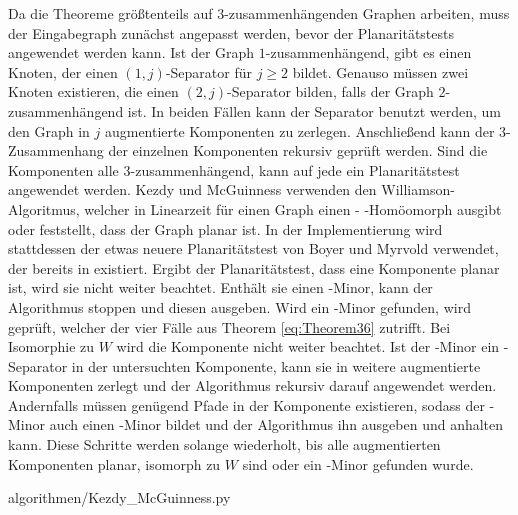 Da die Theoreme größtenteils auf $3$-zusammenhängenden Graphen arbeiten, muss der Eingabegraph \ggf zunächst angepasst werden, bevor der Planaritätstests angewendet werden kann.
Ist der Graph $1$-zusammenhängend, gibt es einen Knoten, der einen $(1, j)$-Separator für $j \geq 2$ bildet.
Genauso müssen zwei Knoten existieren, die einen $(2, j)$-Separator bilden, falls der Graph $2$-zusammenhängend ist.
In beiden Fällen kann der Separator benutzt werden, um den Graph in $j$ augmentierte Komponenten zu zerlegen.
Anschließend kann der $3$-Zusammenhang der einzelnen Komponenten rekursiv geprüft werden.
Sind die Komponenten alle $3$-zusammenhängend, kann auf jede ein Planaritätstest angewendet werden.
Kezdy und McGuinness verwenden den Williamson-Algoritmus,\cite{Wil84} welcher in Linearzeit für einen Graph einen \kf- \bzw \kdd-Homöomorph ausgibt oder feststellt, dass der Graph planar ist.
In der Implementierung wird stattdessen der etwas neuere Planaritätstest von Boyer und Myrvold\cite{BoM04} verwendet, der bereits in \OGDF existiert.
Ergibt der Planaritätstest, dass eine Komponente planar ist, wird sie nicht weiter beachtet.
Enthält sie einen \kf-Minor, kann der Algorithmus stoppen und diesen ausgeben.
Wird ein \kdd-Minor gefunden, wird geprüft, welcher der vier Fälle aus Theorem \ref{eq:Theorem36} zutrifft.
Bei Isomorphie zu $W$ wird die Komponente nicht weiter beachtet.
Ist der \kdd-Minor ein \dd-Separator in der untersuchten Komponente, kann sie in weitere augmentierte Komponenten zerlegt und der Algorithmus rekursiv darauf angewendet werden.
Andernfalls müssen genügend Pfade in der Komponente existieren, sodass der \kdd-Minor auch einen \kf-Minor bildet und der Algorithmus ihn ausgeben und anhalten kann.
Diese Schritte werden solange wiederholt, bis alle augmentierten Komponenten planar, isomorph zu $W$ sind oder ein \kf-Minor gefunden wurde.

\newpage
\begin{minipage}{\linewidth}

                {algorithmen/Kezdy_McGuinness.py}
\end{minipage}
